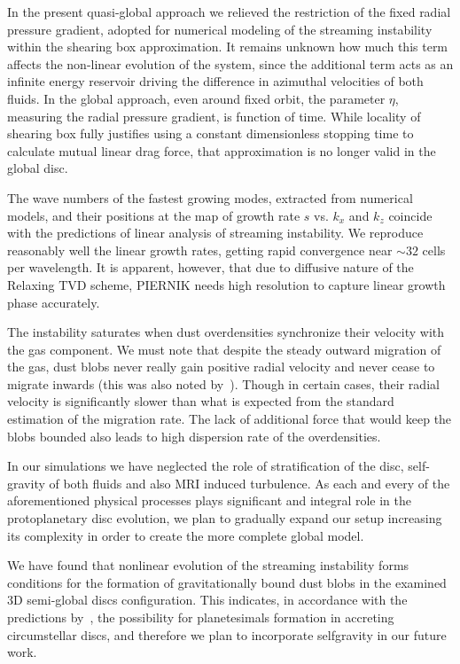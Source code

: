\par In the present quasi-global approach we relieved the restriction of the
fixed  radial pressure gradient, adopted for numerical modeling of the streaming
instability within the shearing box approximation.  It remains unknown how much
this term affects the non-linear evolution of the system, since the additional
term acts as an infinite energy reservoir driving the difference in azimuthal
velocities of both fluids. In the global approach, even around fixed orbit, the
parameter $\eta$, measuring the radial pressure gradient, is function of time.
While locality of shearing box fully justifies using a constant dimensionless
stopping time to calculate mutual linear drag force, that approximation is no
longer valid in the global disc. 

\par The wave numbers of the fastest growing modes, extracted from numerical
models, and their positions at  the  map of growth rate  $s$ vs. $k_x$ and $k_z$
coincide with the predictions of linear analysis of streaming instability. We
reproduce reasonably well the linear growth rates, getting rapid convergence
near $\sim 32$ cells per wavelength. It is apparent, however,  that due to
diffusive nature of the Relaxing TVD scheme, PIERNIK needs high resolution to
capture linear growth phase accurately.

\par The instability saturates when dust overdensities synchronize their
velocity with the gas component. We must note that despite the steady outward
migration of the gas, dust blobs never really gain positive radial velocity and
never cease to migrate inwards (this was also noted by~\cite{JY07}). Though in
certain cases, their radial velocity is significantly slower than what is
expected from the standard estimation of the migration rate. The lack of
additional force that would keep the blobs bounded also leads to high dispersion
rate of the overdensities.

\par In our simulations we have neglected the role of stratification of the
disc, self-gravity of both fluids and also MRI induced turbulence. As each and
every of the aforementioned physical processes plays significant and integral
role in the protoplanetary disc evolution, we plan to gradually expand our setup
increasing its complexity in order to create the more complete global model.

\par We have found that nonlinear evolution of  the streaming instability forms
conditions for the formation  of gravitationally bound dust blobs in the
examined 3D semi-global discs configuration.  This indicates, in accordance with
the predictions by~\citet{J07}, the possibility  for  planetesimals formation in
accreting circumstellar discs,  and therefore we plan to incorporate selfgravity
in our future work.

